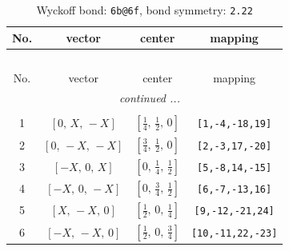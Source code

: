 \documentclass[fleqn,8pt]{jsarticle}
\begin{document}
\renewcommand{\arraystretch}{1.2}
\begin{longtable}{cccc}
\caption{Wyckoff bond: {\tt 6b@6f}, bond symmetry: {\tt 2.22}}
 \\
 \hline \hline
No. & vector & center & mapping \\ \hline \endfirsthead

\multicolumn{3}{l}{\tablename\ \thetable{}} \\
 \hline \hline
No. & vector & center & mapping \\ \hline \endhead

 \hline \hline
\multicolumn{3}{r}{\footnotesize\it continued ...} \\ \endfoot

 \hline \hline
\multicolumn{3}{r}{} \\ \endlastfoot

1 & $\left[ 0,\, X,\, - X \right]$ & $\left[ \frac{1}{4},\, \frac{1}{2},\, 0 \right]$ & {\tt [1,-4,-18,19]} \\ \hline
2 & $\left[ 0,\, - X,\, - X \right]$ & $\left[ \frac{3}{4},\, \frac{1}{2},\, 0 \right]$ & {\tt [2,-3,17,-20]} \\ \hline
3 & $\left[ - X,\, 0,\, X \right]$ & $\left[ 0,\, \frac{1}{4},\, \frac{1}{2} \right]$ & {\tt [5,-8,14,-15]} \\ \hline
4 & $\left[ - X,\, 0,\, - X \right]$ & $\left[ 0,\, \frac{3}{4},\, \frac{1}{2} \right]$ & {\tt [6,-7,-13,16]} \\ \hline
5 & $\left[ X,\, - X,\, 0 \right]$ & $\left[ \frac{1}{2},\, 0,\, \frac{1}{4} \right]$ & {\tt [9,-12,-21,24]} \\ \hline
6 & $\left[ - X,\, - X,\, 0 \right]$ & $\left[ \frac{1}{2},\, 0,\, \frac{3}{4} \right]$ & {\tt [10,-11,22,-23]} \\
\end{longtable}
\renewcommand{\arraystretch}{1.2}
\end{document}
